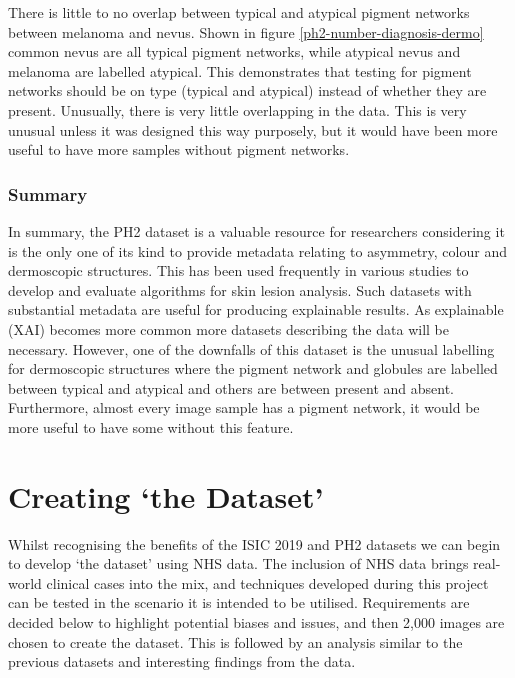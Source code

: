 There is little to no overlap between typical and atypical pigment networks between melanoma and nevus. Shown in figure \ref{ph2-number-diagnosis-dermo} common nevus are all typical pigment networks, while atypical nevus and melanoma are labelled atypical. This demonstrates that testing for pigment networks should be on type (typical and atypical) instead of whether they are present. Unusually, there is very little overlapping in the data. This is very unusual unless it was designed this way purposely, but it would have been more useful to have more samples without pigment networks.

\subsubsection{Summary}
In summary, the PH2 dataset is a valuable resource for researchers considering it is the only one of its kind to provide metadata relating to asymmetry, colour and dermoscopic structures. This has been used frequently in various studies to develop and evaluate algorithms for skin lesion analysis. Such datasets with substantial metadata are useful for producing explainable results. As explainable (XAI) becomes more common more datasets describing the data will be necessary. However, one of the downfalls of this dataset is the unusual labelling for dermoscopic structures where the pigment network and globules are labelled between typical and atypical and others are between present and absent. Furthermore, almost every image sample has a pigment network, it would be more useful to have some without this feature.


\pagebreak

\section{Creating `the Dataset'}
Whilst recognising the benefits of the ISIC 2019 and PH2 datasets we can begin to develop `the dataset' using NHS data. The inclusion of NHS data brings real-world clinical cases into the mix, and techniques developed during this project can be tested in the scenario it is intended to be utilised. Requirements are decided below to highlight potential biases and issues, and then 2,000 images are chosen to create the dataset. This is followed by an analysis similar to the previous datasets and interesting findings from the data.


